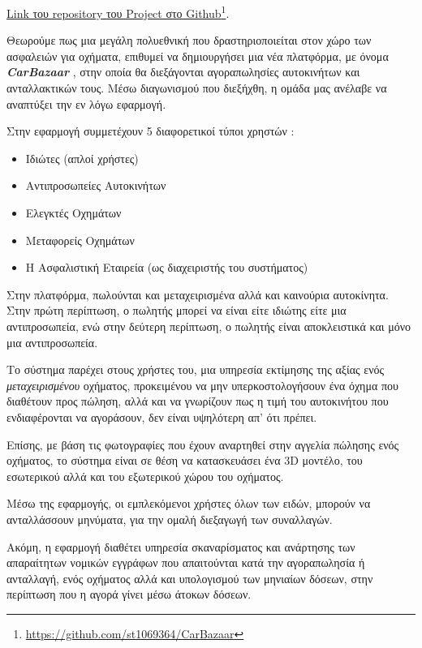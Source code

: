 \documentclass{../ol-softwaremanual}
\newcommand{\doclink}[2]{\href{#1}{#2}\footnote{\url{#1}}}
\begin{document}
	\en 	\doclink{https://github.com/st1069364/CarBazaar}{Link \gr του \en  repository \gr του \en Project \gr στο \en Github}. \gr
	
	\newpage
	
	
	\vspace{10pt}
	
	\flushleft
	
	Θεωρούμε πως μια μεγάλη πολυεθνική που δραστηριοποιείται στον χώρο των ασφαλειών για οχήματα, επιθυμεί να δημιουργήσει μια νέα πλατφόρμα, με όνομα  \en \textbf{\textit{CarBazaar}} \gr, στην οποία θα διεξάγονται αγοραπωλησίες αυτοκινήτων και ανταλλακτικών τους. Μέσω διαγωνισμού που διεξήχθη, η ομάδα μας ανέλαβε να αναπτύξει την εν λόγω εφαρμογή. \break
	
	Στην εφαρμογή συμμετέχουν 5 διαφορετικοί τύποι χρηστών :
	
	\begin{itemize}
		\item Ιδιώτες (απλοί χρήστες)
		\item Αντιπροσωπείες Αυτοκινήτων
		\item Ελεγκτές Οχημάτων
		\item Μεταφορείς Οχημάτων
		\item Η Ασφαλιστική Εταιρεία (ως διαχειριστής του συστήματος)
	\end{itemize}
	
	Στην πλατφόρμα, πωλούνται και μεταχειρισμένα αλλά και καινούρια αυτοκίνητα. Στην πρώτη περίπτωση, ο πωλητής μπορεί να είναι είτε ιδιώτης είτε μια αντιπροσωπεία, ενώ στην δεύτερη περίπτωση, ο πωλητής είναι αποκλειστικά και μόνο μια αντιπροσωπεία.  \break	
	
	Το σύστημα παρέχει στους χρήστες του, μια υπηρεσία εκτίμησης της αξίας ενός \textit{μεταχειρισμένου} οχήματος, προκειμένου να μην υπερκοστολογήσουν ένα όχημα που διαθέτουν προς πώληση, αλλά και να γνωρίζουν πως η τιμή του αυτοκινήτου που ενδιαφέρονται να αγοράσουν, δεν είναι υψηλότερη απ' ότι πρέπει. \break
	
	Επίσης, με βάση τις φωτογραφίες που έχουν αναρτηθεί στην αγγελία πώλησης ενός οχήματος, το σύστημα είναι σε θέση να κατασκευάσει ένα 3\en D \gr μοντέλο, του εσωτερικού αλλά και του εξωτερικού χώρου του οχήματος. \break
	
	Μέσω της εφαρμογής, οι εμπλεκόμενοι χρήστες όλων των ειδών, μπορούν να ανταλλάσσουν μηνύματα, για την ομαλή διεξαγωγή των συναλλαγών. \break
	
	Ακόμη, η εφαρμογή διαθέτει υπηρεσία σκαναρίσματος και ανάρτησης των απαραίτητων νομικών εγγράφων που απαιτούνται κατά την αγοραπωλησία ή ανταλλαγή, ενός οχήματος αλλά και υπολογισμού των μηνιαίων δόσεων, στην περίπτωση που η αγορά γίνει μέσω άτοκων δόσεων. \break
	
\end{document}
